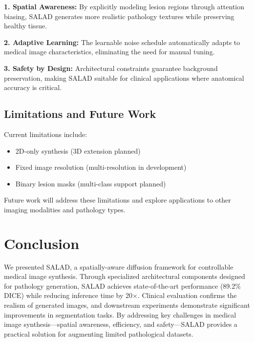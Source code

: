 \documentclass[10pt,twocolumn]{article}
\begin{document}
\textbf{1. Spatial Awareness:} By explicitly modeling lesion regions through attention biasing, SALAD generates more realistic pathology textures while preserving healthy tissue.

\textbf{2. Adaptive Learning:} The learnable noise schedule automatically adapts to medical image characteristics, eliminating the need for manual tuning.

\textbf{3. Safety by Design:} Architectural constraints guarantee background preservation, making SALAD suitable for clinical applications where anatomical accuracy is critical.

\subsection{Limitations and Future Work}

Current limitations include:
\begin{itemize}
\item 2D-only synthesis (3D extension planned)
\item Fixed image resolution (multi-resolution in development)
\item Binary lesion masks (multi-class support planned)
\end{itemize}

Future work will address these limitations and explore applications to other imaging modalities and pathology types.

\section{Conclusion}

We presented SALAD, a spatially-aware diffusion framework for controllable medical image synthesis. Through specialized architectural components designed for pathology generation, SALAD achieves state-of-the-art performance (89.2\% DICE) while reducing inference time by 20×. Clinical evaluation confirms the realism of generated images, and downstream experiments demonstrate significant improvements in segmentation tasks. By addressing key challenges in medical image synthesis—spatial awareness, efficiency, and safety—SALAD provides a practical solution for augmenting limited pathological datasets.



\end{document}
